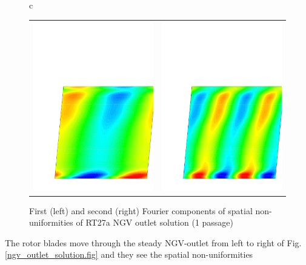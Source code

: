 \begin{figure}
\begin{center}
\begin{tabular}{c}
{\begin{tabular}{cc}
        \includegraphics[width=70mm,clip=t]{CHAP_RT27/FIGURE/out_entr1.pdf}
        &
        \includegraphics[width=70mm,clip=t]{CHAP_RT27/FIGURE/out_entr2.pdf}
        \end{tabular}}
    \end{tabular}
 \end{center}
 \vspace{-8mm}
 \caption{First (left) and second (right) Fourier components
          of spatial non-uniformities of RT27a NGV outlet solution (1 passage)}
 \label{ngv_outlet_decomposed1.fig}
\end{figure}
%
%
%
 The rotor blades move through the steady NGV-outlet from left to right of
 Fig. \ref{ngv_outlet_solution.fig} and they see the spatial non-uniformities
